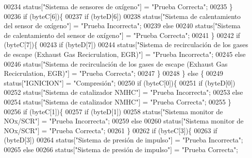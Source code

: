 \begin{DoxyCode}
00234                 status[\textcolor{stringliteral}{"Sistema de sensores de oxígeno"}] = \textcolor{stringliteral}{"Prueba Correcta"};
00235         \}
00236         \textcolor{keywordflow}{if} (byteC[6])\{
00237             \textcolor{keywordflow}{if} (byteD[6])
00238                 status[\textcolor{stringliteral}{"Sistema de calentamiento del sensor de oxígeno"}] = \textcolor{stringliteral}{"Prueba Incorrecta"};
00239             \textcolor{keywordflow}{else}
00240                 status[\textcolor{stringliteral}{"Sistema de calentamiento del sensor de oxígeno"}] = \textcolor{stringliteral}{"Prueba Correcta"};
00241         \}
00242         \textcolor{keywordflow}{if} (byteC[7])\{
00243             \textcolor{keywordflow}{if} (byteD[7])
00244                 status[\textcolor{stringliteral}{"Sistema de recirculación de los gases de escape (Exhaust Gas Recicrulation, EGR)"}] 
      = \textcolor{stringliteral}{"Prueba Incorrecta"};
00245             \textcolor{keywordflow}{else}
00246                 status[\textcolor{stringliteral}{"Sistema de recirculación de los gases de escape (Exhaust Gas Recicrulation, EGR)"}] 
      = \textcolor{stringliteral}{"Prueba Correcta"};
00247         \}
00248     \} \textcolor{keywordflow}{else} \{
00249         status[\textcolor{stringliteral}{"IGNICION"}] = \textcolor{stringliteral}{"Compresión"};
00250         \textcolor{keywordflow}{if} (byteC[0])\{
00251             \textcolor{keywordflow}{if} (byteD[0])
00252                 status[\textcolor{stringliteral}{"Sistema de catalizador NMHC"}] = \textcolor{stringliteral}{"Prueba Incorrecta"};
00253             \textcolor{keywordflow}{else}
00254                 status[\textcolor{stringliteral}{"Sistema de catalizador NMHC"}] = \textcolor{stringliteral}{"Prueba Correcta"};
00255         \}
00256         \textcolor{keywordflow}{if} (byteC[1])\{
00257             \textcolor{keywordflow}{if} (byteD[1])
00258                 status[\textcolor{stringliteral}{"Sistema monitor de NOx/SCR"}] = \textcolor{stringliteral}{"Prueba Incorrecta"};
00259             \textcolor{keywordflow}{else}
00260                 status[\textcolor{stringliteral}{"Sistema monitor de NOx/SCR"}] = \textcolor{stringliteral}{"Prueba Correcta"};
00261         \}
00262         \textcolor{keywordflow}{if} (byteC[3])\{
00263             \textcolor{keywordflow}{if} (byteD[3])
00264                 status[\textcolor{stringliteral}{"Sistema de presión de impulso"}] = \textcolor{stringliteral}{"Prueba Incorrecta"};
00265             \textcolor{keywordflow}{else}
00266                 status[\textcolor{stringliteral}{"Sistema de presión de impulso"}] = \textcolor{stringliteral}{"Prueba Correcta"};

\end{DoxyCode}
